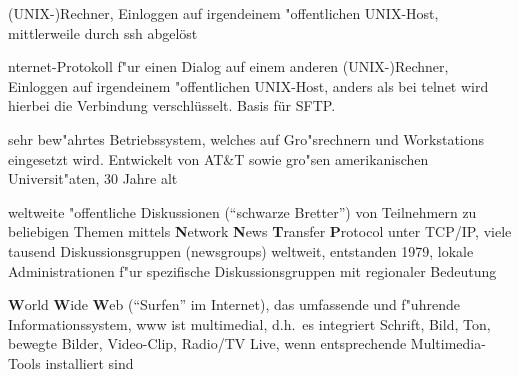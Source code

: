\begin{description}
    (UNIX-)Rechner, Einloggen auf irgendeinem "offentlichen UNIX-Host,
    mittlerweile durch ssh abgelöst
  \item[ssh] nternet-Protokoll f"ur einen Dialog auf einem anderen
    (UNIX-)Rechner, Einloggen auf irgendeinem "offentlichen UNIX-Host,
    anders als bei telnet  wird hierbei die Verbindung
    verschlüsselt. Basis für SFTP.
  \item[UNIX] sehr bew"ahrtes Betriebssystem, welches auf Gro"srechnern und
    Workstations eingesetzt wird. Entwickelt von AT\&T sowie gro"sen
    amerikanischen Universit"aten, 30 Jahre alt
  \item[Usenet News] weltweite "offentliche Diskussionen ("`schwarze Bretter"')
    von Teilnehmern zu beliebigen Themen mittels \textbf{N}etwork
    \textbf{N}ews \textbf{T}ransfer \textbf{P}rotocol unter TCP/IP, viele
    tausend Diskussionsgruppen (newsgroups) weltweit, entstanden 1979, lokale
    Administrationen f"ur spezifische Diskussionsgruppen mit regionaler
    Bedeutung
  \item[WWW] \textbf{W}orld \textbf{W}ide \textbf{W}eb ("`Surfen"' im
    Internet), das umfassende und f"uhrende Informationssystem, www ist
    multimedial, d.h.\  es integriert Schrift, Bild, Ton, bewegte Bilder,
    Video-Clip, Radio/TV Live, wenn entsprechende Multimedia-Tools installiert
    sind
\end{description}
